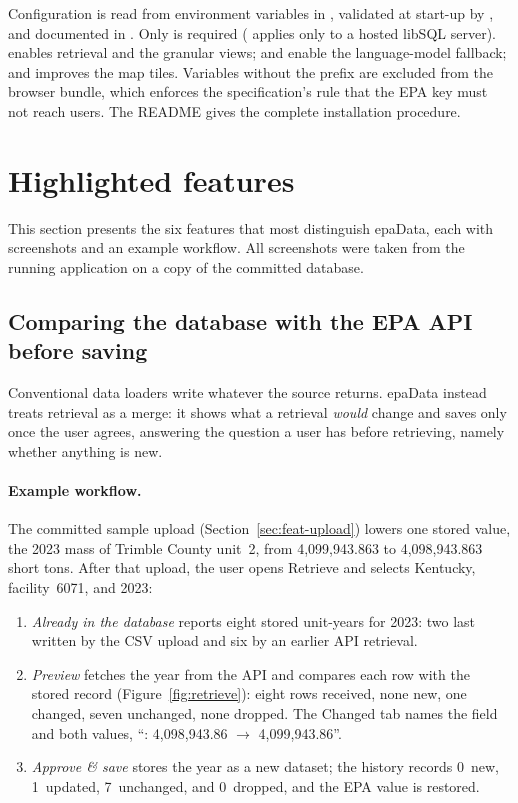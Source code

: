 \documentclass[11pt,a4paper]{article}
\begin{document}
Configuration is read from environment variables in , validated at start-up by
, and documented in . Only  is
required ( applies only to a hosted libSQL server).  enables retrieval and the granular views; 
and  enable the language-model fallback; and
 improves the map tiles. Variables without the
 prefix are excluded from the browser bundle, which enforces the
specification's rule that the EPA key must not reach users. The README gives the complete
installation procedure.

\section{Highlighted features}
\label{sec:features}

This section presents the six features that most distinguish epaData, each with screenshots
and an example workflow. All screenshots were taken from the running application on a copy of
the committed database.

\subsection{Comparing the database with the EPA API before saving}
\label{sec:feat-retrieve}

Conventional data loaders write whatever the source returns. epaData instead treats retrieval
as a merge: it shows what a retrieval \emph{would} change and saves only once the user agrees,
answering the question a user has before retrieving, namely whether anything is new.

\paragraph{Example workflow.} The committed sample upload (Section~\ref{sec:feat-upload})
lowers one stored value, the 2023 \COtwo{} mass of Trimble County unit~2, from 4{,}099{,}943.863
to 4{,}098{,}943.863 short tons. After that upload, the user opens Retrieve and selects
Kentucky, facility~6071, and 2023:
\begin{enumerate}
  \item \emph{Already in the database} reports eight stored unit-years for 2023: two last
        written by the CSV upload and six by an earlier API retrieval.
  \item \emph{Preview} fetches the year from the API and compares each row with the stored
        record (Figure~\ref{fig:retrieve}): eight rows received, none new, one changed, seven
        unchanged, none dropped. The Changed tab names the field and both values,
        ``\COtwo: 4{,}098{,}943.86 $\to$ 4{,}099{,}943.86''.
  \item \emph{Approve \& save} stores the year as a new dataset; the history records 0~new,
        1~updated, 7~unchanged, and 0~dropped, and the EPA value is restored.
\end{enumerate}
\end{document}
